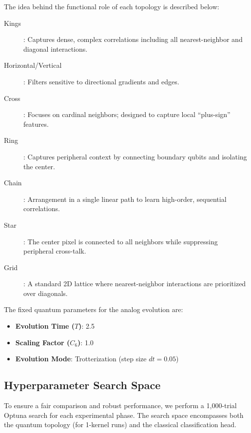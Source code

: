 \documentclass[11pt,a4paper]{article}
\begin{document}
The idea behind the functional role of each topology is described below:
\begin{description}
    \item[Kings]: Captures dense, complex correlations including all nearest-neighbor and diagonal interactions.
    \item[Horizontal/Vertical]: Filters sensitive to directional gradients and edges.
    \item[Cross]: Focuses on cardinal neighbors; designed to capture local ``plus-sign'' features.
    \item[Ring]: Captures peripheral context by connecting boundary qubits and isolating the center.
    \item[Chain]: Arrangement in a single linear path to learn high-order, sequential correlations.
    \item[Star]: The center pixel is connected to all neighbors while suppressing peripheral cross-talk.
    \item[Grid]: A standard 2D lattice where nearest-neighbor interactions are prioritized over diagonals.
\end{description}

The fixed quantum parameters for the analog evolution are:
\begin{itemize}
    \item \textbf{Evolution Time ($T$)}: 2.5
    \item \textbf{Scaling Factor ($C_6$)}: 1.0
    \item \textbf{Evolution Mode}: Trotterization (step size $dt = 0.05$)
\end{itemize}



\subsection{Hyperparameter Search Space}
To ensure a fair comparison and robust performance, we perform a 1,000-trial Optuna search for each experimental phase. The search space encompasses both the quantum topology (for 1-kernel runs) and the classical classification head.
\end{document}
